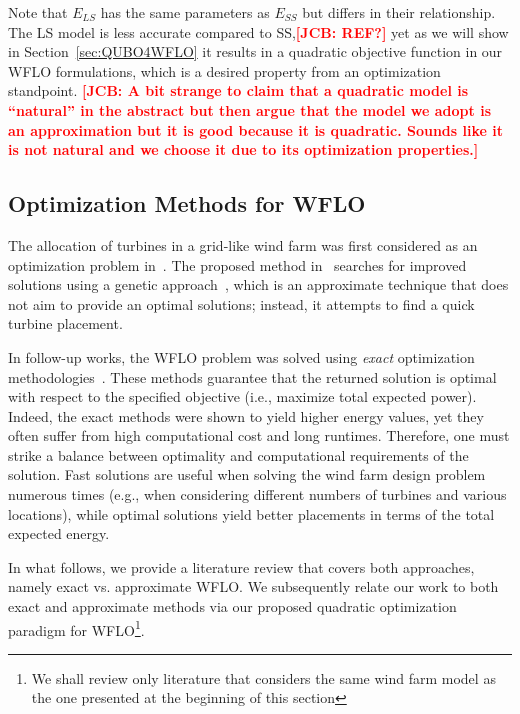 \documentclass[preprint,12pt]{elsarticle}
\newcommand{\todo}[1]{{\textcolor{red}{\bf {#1}}}}
\begin{document}
Note that $E_{LS}$ has the same parameters as $E_{SS}$ but differs in their relationship.
The LS model is less accurate compared to SS,\todo{[JCB: REF?]} yet as we will show in Section~\ref{sec:QUBO4WFLO} it 
results in a quadratic objective function in our WFLO formulations, which is a desired property from an optimization standpoint. \todo{[JCB: A bit strange to claim that a quadratic model is ``natural'' in the abstract but then argue that the model we adopt is an approximation but it is good because it is quadratic. Sounds like it is not natural and we choose it due to its optimization properties.]}
 

\subsection{Optimization Methods for WFLO}

The allocation of turbines in a grid-like wind farm was first considered 
as an optimization problem in~\cite{MOSETTI1994105}. The proposed method in~\cite{MOSETTI1994105}
searches for improved solutions using a 
genetic approach~\cite{davis1991handbook},
which is an approximate technique 
that does not aim to provide an optimal solutions;
instead, it attempts to find a quick turbine placement.


In follow-up works, 
the WFLO problem was solved using \emph{exact}  
optimization methodologies~\cite{turner2014new,Zhang2014}. 
These methods guarantee that the returned solution is optimal with respect
to the specified objective (i.e., maximize total expected power). 
Indeed, the exact methods were shown to yield higher energy values, yet they often suffer from 
high computational cost and long runtimes. Therefore, one must strike a balance between optimality and computational requirements of the solution. 
Fast solutions are useful when solving the wind farm design problem numerous times (e.g., when considering different numbers of turbines and various locations),
while optimal solutions yield better placements in terms of the total expected energy.

In what follows, we provide a literature review that covers both approaches, namely exact vs. approximate WFLO.
We subsequently relate our 
work to both exact and approximate methods via our proposed quadratic optimization paradigm for WFLO\footnote{We shall review 
only literature that considers the same wind farm model as the one presented at the beginning of this section}. 
 
\end{document}
